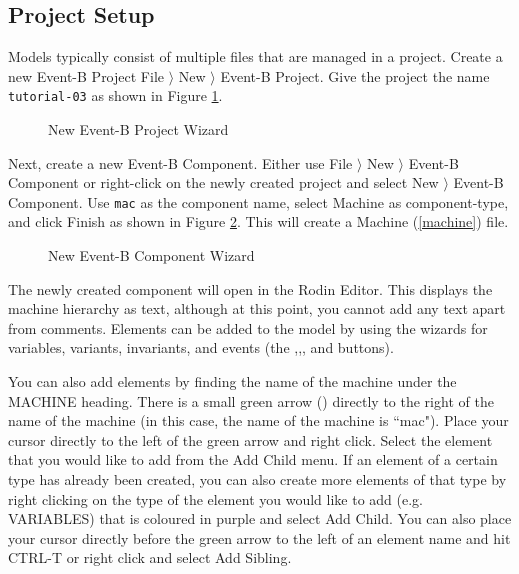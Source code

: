 \subsection{Project Setup}
\label{tut_project_setup}

Models typically consist of multiple files that are managed in a project.  Create a new Event-B Project \textsf{File $\rangle$ New $\rangle$ Event-B Project}.  Give the project the name \texttt{tutorial-03} as shown in Figure \ref{fig_tut_03_new_project_wizard}.

\begin{figure}[!ht]
\begin{center}
	\caption{New Event-B Project Wizard}
	\label{fig_tut_03_new_project_wizard}
\end{center}
\end{figure}


Next, create a new Event-B Component.  Either use \textsf{File $\rangle$ New $\rangle$ Event-B Component} or right-click on the newly created project and select \textsf{New $\rangle$ Event-B Component}.  Use \texttt{mac} as the component name, select \textsf{Machine} as component-type, and click \textsf{Finish} as shown in Figure \ref{fig_tut_03_new_component_wizard}. This will create a Machine (\ref{machine}) file.

\begin{figure}[!ht]
\begin{center}
	\caption{New Event-B Component Wizard}
	\label{fig_tut_03_new_component_wizard}
\end{center}
\end{figure}

The newly created component will open in the Rodin Editor. This displays the machine hierarchy as text, although at this point, you cannot add any text apart from comments. Elements can be added to the model by using the wizards for variables, variants, invariants, and events (the ,,, and  buttons). 

You can also add elements by finding the name of the machine under the MACHINE heading. There is a small green arrow () directly to the right of the name of the machine (in this case, the name of the machine is ``mac"). Place your cursor directly to the left of the green arrow and right click. Select the element that you would like to add from the \textsf{Add Child} menu. If an element of a certain type has already been created, you can also create more elements of that type by right clicking on the type of the element you would like to add (e.g. \textsf{VARIABLES}) that is coloured in purple and select \textsf{Add Child}. You can also place your cursor directly before the green arrow to the left of an element name and hit \textsf{CTRL-T} or right click and select \textsf{Add Sibling}.

